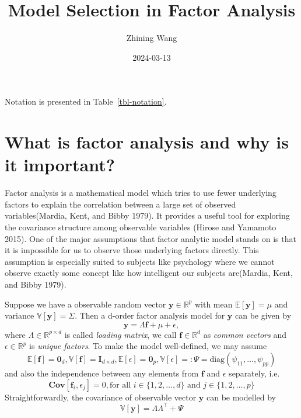 \documentclass[
  12pt,
]{amsart}
\title{Model Selection in Factor Analysis}
\author{Zhining Wang}
\date{2024-03-13}
\begin{document}
\maketitle

Notation is presented in Table~\ref{tbl-notation}.

\section{What is factor analysis and why is it
important?}\label{what-is-factor-analysis-and-why-is-it-important}

Factor analysis is a mathematical model which tries to use fewer
underlying factors to explain the correlation between a large set of
observed variables(Mardia, Kent, and Bibby 1979). It provides a useful
tool for exploring the covariance structure among observable variables
(Hirose and Yamamoto 2015). One of the major assumptions that factor
analytic model stands on is that it is impossible for us to observe
those underlying factors directly. This assumption is especially suited
to subjects like psychology where we cannot observe exactly some concept
like how intelligent our subjects are(Mardia, Kent, and Bibby 1979).

Suppose we have a observable random vector
\(\mathbf{y}\in \mathbb{R}^p\) with mean \(\mathbb{E}[\mathbf{y}]=\mu\)
and variance \(\mathbb{V}[\mathbf{y}]=\Sigma\). Then a d-order factor
analysis model for \(\mathbf{y}\) can be given by \begin{equation}
\mathbf{y}=\Lambda \mathbf{f}+\mu+\epsilon,
\end{equation} where \(\Lambda \in \mathbb{R}^{p \times d}\) is called
\emph{loading matrix}, we call \(\mathbf{f} \in \mathbb{R}^{d}\) as
\emph{common vectors} and \(\epsilon \in \mathbb{R}^{p}\) is
\emph{unique factors}. To make the model well-defined, we may assume
\[\mathbb{E}[\mathbf{f}]=\mathbf{0}_d, \mathbb{V}[\mathbf{f}]=\mathbf{I}_{d\times d}, \mathbb{E}[\epsilon]=\mathbf{0}_p, \mathbb{V}[\epsilon]=:\Psi=\text{diag}(\psi_{11},\dots,\psi_{pp})\]
and also the independence between any elements from \(\mathbf{f}\) and
\(\epsilon\) separately, i.e.
\[\mathbf{Cov}[\mathbf{f}_i,\epsilon_j]=0, \text{for all } i\in\{1,2,\dots,d\} \text{ and } j \in \{1,2,\dots,p\}\]
Straightforwardly, the covariance of observable vector \(\mathbf{y}\)
can be modelled by\\
\begin{equation}
\mathbb{V}[\mathbf{y}]=\Lambda\Lambda^\top+\Psi
\end{equation}
\end{document}
